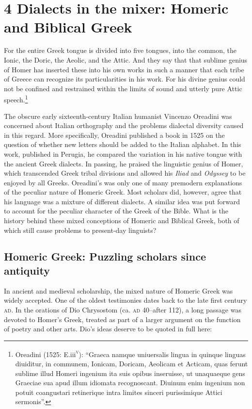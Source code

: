 \clearpage\section[4 Dialects in the mixer: Homeric and Biblical Greek]{\textsc{4 }Dialects in the mixer: Homeric and Biblical Greek}
\hypertarget{Toc19704826}{}\begin{styleQuote}
For the entire Greek tongue is divided into five tongues, into the common, the Ionic, the Doric, the Aeolic, and the Attic. And they say that that sublime genius of Homer has inserted these into his own works in such a manner that each tribe of Greece can recognize its particularities in his work. For his divine genius could not be confined and restrained within the limits of sound and utterly pure Attic speech.\footnote{ Oreadini (1525: E.iii\textsc{\textsuperscript{v}}): “Graeca namque uniuersalis lingua in quinque linguas diuiditur, in communem, Ionicam, Doricam, Aeolicam et Acticam, quas ferunt sublime illud Homeri ingenium ita suis opibus inseruisse, ut unaquaeque gens Graeciae sua apud illum idiomata recognoscant. Diuinum enim ingenium non potuit coangustari retinerique intra limites sinceri purissimique Attici sermonis”.}
\end{styleQuote}

\begin{styleStandard}
The obscure early sixteenth-century Italian humanist Vincenzo Oreadini was concerned about Italian orthography and the problems dialectal diversity caused in this regard. More specifically, Oreadini published a book in 1525 on the question of whether new letters should be added to the Italian alphabet. In this work, published in Perugia, he compared the variation in his native tongue with the ancient Greek dialects. In passing, he praised the linguistic genius of Homer, which transcended Greek tribal divisions and allowed his \textit{Iliad} and \textit{Odyssey} to be enjoyed by all Greeks. Oreadini’s was only one of many premodern explanations of the peculiar nature of Homeric Greek. Most scholars did, however, agree that his language was a mixture of different dialects. A similar idea was put forward to account for the peculiar character of the Greek of the Bible. What is the history behind these mixed conceptions of Homeric and Biblical Greek, both of which still cause problems to present-day linguists?
\end{styleStandard}

\subsection{Homeric Greek: Puzzling scholars since antiquity}
\hypertarget{Toc19704827}{}\begin{styleStandard}
In ancient and medieval scholarship, the mixed nature of Homeric Greek was widely accepted. One of the oldest testimonies dates back to the late first century \textsc{ad}. In the orations of Dio Chrysostom (ca. \textsc{ad} 40–after 112), a long passage was devoted to Homer’s Greek, treated as part of a larger argument on the function of poetry and other arts. Dio’s ideas deserve to be quoted in full here:
\end{styleStandard}

